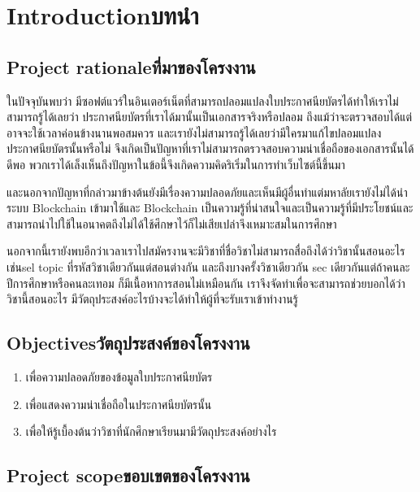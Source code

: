 \chapter{\ifenglish Introduction\else บทนำ\fi}

\section{\ifenglish Project rationale\else ที่มาของโครงงาน\fi}
\enskip \enskip \enskip \enskip \enskip 
ในปัจจุบันพบว่า มีซอฟต์แวร์ในอินเตอร์เน็ตที่สามารถปลอมแปลงใบประกาศนียบัตรได้ทำให้เราไม่สามารถรู้ได้เลยว่า ประกาศนียบัตรที่เราได้มานั้นเป็นเอกสารจริงหรือปลอม 
ถึงแม้ว่าจะตรวจสอบได้แต่อาจจะใช้เวลาค่อนข้างนานพอสมควร  และเรายังไม่สามารถรู้ได้เลยว่ามีใครมาแก้ไขปลอมแปลงประกาศนียบัตรนั้นหรือไม่
จึงเกิดเป็นปัญหาที่เราไม่สามารถตรวจสอบความน่าเชื่อถือของเอกสารนั้นได้ดีพอ พวกเราได้เล็งเห็นถึงปัญหาในข้อนี้จึงเกิดความคิดริเริ่มในการทำเว็บไซต์นี้ขึ้นมา

\enskip \enskip
และนอกจากปัญหาที่กล่าวมาข้างต้นยังมีเรื่องความปลอดภัยและเห็นมีผู้อื่นทำแต่มหาลัยเรายังไม่ได้นำระบบ Blockchain เข้ามาใช้และ Blockchain เป็นความรู้ที่น่าสนใจและเป็นความรู้ที่มีประโยชน์และสามารถนำไปใช้ในอนาคตถึงไม่ได้ใช้ศึกษาไว้ก็ไม่เสียเปล่าจึงเหมาะสมในการศึกษา

\enskip \enskip
นอกจากนี้เรายังพบอีกว่าเวลาเราไปสมัครงานจะมีวิชาที่ชื่อวิชาไม่สามารถสื่อถึงได้ว่าวิชานั้นสอนอะไรเช่นsel topic ที่รหัสวิชาเดียวกันแต่สอนต่างกัน และถึงบางครั้งวิชาเดียวกัน sec เดียวกันแต่ถ้าคนละปีการศึกษาหรือคนละเทอม ก็มีเนื้อหาการสอนไม่เหมือนกัน เราจึงจัดทำเพื่อจะสามารถช่วยบอกได้ว่าวิชานี้สอนอะไร มีวัตถุประสงค์อะไรบ้างจะได้ทำให้ผู้ที่จะรับเราเข้าทำงานรู้


\section{\ifenglish Objectives\else วัตถุประสงค์ของโครงงาน\fi}
\begin{enumerate}
    \item เพื่อความปลอดภัยของข้อมูลใบประกาศนียบัตร
    \item เพื่อแสดงความน่าเชื่อถือในประกาศนียบัตรนั้น
    \item เพื่อให้รู้เบื้องต้นว่าวิชาที่นักศึกษาเรียนมามีวัตถุประสงค์อย่างไร
\end{enumerate}

\section{\ifenglish Project scope\else ขอบเขตของโครงงาน\fi}

